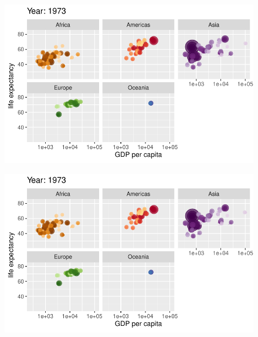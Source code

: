 \documentclass[
  letterpaper,
  DIV=11,
  numbers=noendperiod]{scrartcl}
\begin{document}
\begin{figure}[H]

{\centering \includegraphics{class05_files/figure-pdf/unnamed-chunk-24-38.pdf}

}

\end{figure}

\begin{figure}[H]

{\centering \includegraphics{class05_files/figure-pdf/unnamed-chunk-24-39.pdf}

}

\end{figure}
\end{document}

